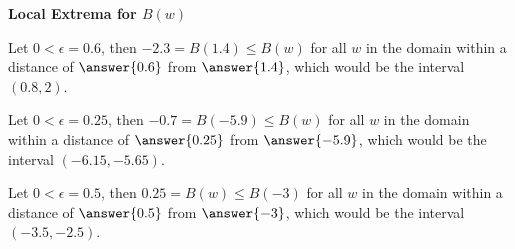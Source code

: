 \documentclass{ximera}
\begin{document}
\begin{explanation} \textbf{\textcolor{red!75!green}{Local Extrema for $B(w)$}}
 

Let $0 < \epsilon = 0.6$, then   $-2.3 = B(1.4) \leq B(w)$ for all $w$ in the domain within a distance of $\answer{0.6}$ from $\answer{1.4}$, which would be the interval $(0.8, 2)$.

Let $0 < \epsilon = 0.25$, then   $-0.7 = B(-5.9) \leq B(w)$ for all $w$ in the domain within a distance of $\answer{0.25}$ from $\answer{-5.9}$, which would be the interval $(-6.15, -5.65)$.

Let $0 < \epsilon = 0.5$, then  $0.25 = B(w) \leq B(-3)$ for all $w$ in the domain within a distance of $\answer{0.5}$ from $\answer{-3}$, which would be the interval $(-3.5, -2.5)$.
\end{explanation}
\end{document}
